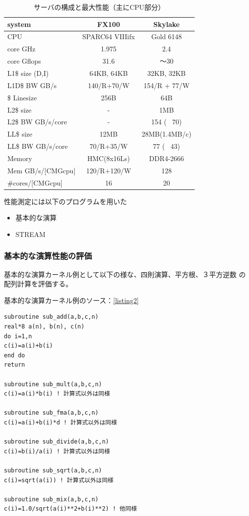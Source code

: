 \documentclass[submit,techrep,noauthor]{ipsj}
\begin{document}
\begin{table}[tb]
\scriptsize
\caption{サーバの構成と最大性能（主にCPU部分）}
\label{tab:server-config}
\footnotesize
\begin{tabular}{l|c|c} \hline
\scriptsize
system			&	FX100	&	Skylake	\\ \hline
CPU				&	SPARC64 VIIIifx	&	Gold 6148	\\ \hline
core GHz		&	1.975	&	2.4	\\ \hline
core Gflops	&	31.6	&	〜30	\\ \hline
L1\$ size (D,I)		&	64KB, 64KB	&	32KB, 32KB	\\ \hline
L1D\$ BW GB/s	&	140/R+70/W	&	154/R + 77/W	\\ \hline
\$ Linesize 	&	256B	&	64B	\\ \hline
L2\$ size		&	-	&	1MB	\\ \hline
L2\$ BW GB/s/core	&	-	&	154 ( ~70)	\\ \hline
LL\$ size		&	12MB	&	28MB(1.4MB/c)	\\ \hline
LL\$ BW GB/s/core	&	70/R+35/W	&	77 ( ~43)	\\ \hline
Memory			&	HMC(8x16Ls)	&	DDR4-2666	\\ \hline
Mem GB/s/[CMGcpu]	&	120/R+120/W	&	128	\\ \hline
\#cores/[CMGcpu]	&	16	&	20	\\ \hline
\end{tabular}
\end{table}

性能測定には以下のプログラムを用いた
\begin{itemize}
\item{基本的な演算}
\item{STREAM}
\end{itemize}


\subsubsection{基本的な演算性能の評価}

基本的な演算カーネル例として以下の様な、四則演算、平方根、３平方逆数
の配列計算を評価する。

基本的な演算カーネル例のソース：\lstlistingname \ref{listing2}

\begin{lstlisting}[caption={\hfill},label={listing2},captionpos=t]
subroutine sub_add(a,b,c,n)
real*8 a(n), b(n), c(n)  
do i=1,n
c(i)=a(i)+b(i)
end do
return

subroutine sub_mult(a,b,c,n)
c(i)=a(i)*b(i) ! 計算式以外は同様

subroutine sub_fma(a,b,c,n)
c(i)=a(i)+b(i)*d ! 計算式以外は同様

subroutine sub_divide(a,b,c,n)
c(i)=b(i)/a(i) ! 計算式以外は同様

subroutine sub_sqrt(a,b,c,n)
c(i)=sqrt(a(i)) ! 計算式以外は同様

subroutine sub_mix(a,b,c,n)
c(i)=1.0/sqrt(a(i)**2+b(i)**2) ! 他同様

\end{lstlisting}
\end{document}

